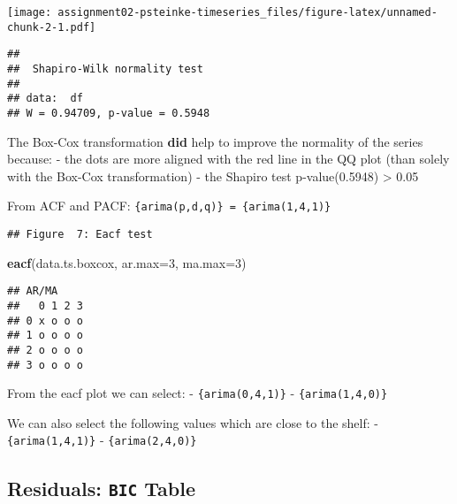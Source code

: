 \documentclass[]{article}
\newenvironment{Shaded}{\begin{snugshade}}{\end{snugshade}}
\newcommand{\DataTypeTok}[1]{\textcolor[rgb]{0.13,0.29,0.53}{#1}}
\newcommand{\DecValTok}[1]{\textcolor[rgb]{0.00,0.00,0.81}{#1}}
\newcommand{\KeywordTok}[1]{\textcolor[rgb]{0.13,0.29,0.53}{\textbf{#1}}}
\newcommand{\NormalTok}[1]{#1}
\newcommand{\OperatorTok}[1]{\textcolor[rgb]{0.81,0.36,0.00}{\textbf{#1}}}
\newcommand{\StringTok}[1]{\textcolor[rgb]{0.31,0.60,0.02}{#1}}
\begin{document}
\texttt{[image: assignment02-psteinke-timeseries\_files/figure-latex/unnamed-chunk-2-1.pdf]}

\begin{verbatim}
## 
##  Shapiro-Wilk normality test
## 
## data:  df
## W = 0.94709, p-value = 0.5948
\end{verbatim}

The Box-Cox transformation \textbf{did} help to improve the normality of
the series because: - the dots are more aligned with the red line in the
QQ plot (than solely with the Box-Cox transformation) - the Shapiro test
p-value(0.5948) \textgreater{} 0.05

From ACF and PACF: \texttt{\{arima(p,d,q)\}\ =\ \{arima(1,4,1)\}}

\begin{Shaded}
\end{Shaded}

\begin{verbatim}
## Figure  7: Eacf test
\end{verbatim}

\begin{Shaded}
\begin{Highlighting}[]
\KeywordTok{eacf}\NormalTok{(data.ts.boxcox, }\DataTypeTok{ar.max=}\DecValTok{3}\NormalTok{, }\DataTypeTok{ma.max=}\DecValTok{3}\NormalTok{)}
\end{Highlighting}
\end{Shaded}

\begin{verbatim}
## AR/MA
##   0 1 2 3
## 0 x o o o
## 1 o o o o
## 2 o o o o
## 3 o o o o
\end{verbatim}

From the eacf plot we can select: - \texttt{\{arima(0,4,1)\}} -
\texttt{\{arima(1,4,0)\}}

We can also select the following values which are close to the shelf: -
\texttt{\{arima(1,4,1)\}} - \texttt{\{arima(2,4,0)\}}

\hypertarget{residuals-bic-table}{%
\subsection{\texorpdfstring{Residuals: \texttt{BIC}
Table}{Residuals: BIC Table}}\label{residuals-bic-table}}
\end{document}
